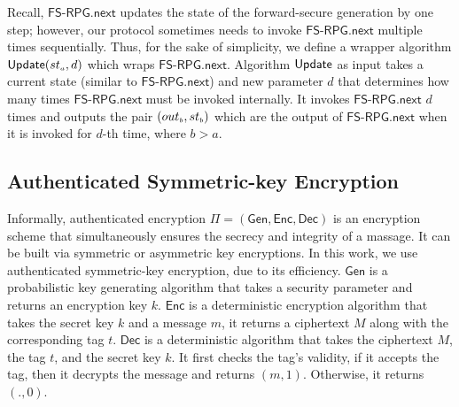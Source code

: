 Recall, $\mathsf{FS\text{-}RPG.next}$ updates the state of the forward-secure generation by one step; however, our protocol sometimes needs to invoke $\mathsf{FS\text{-}RPG.next}$ multiple times sequentially. Thus, for the sake of simplicity, we define a wrapper algorithm $ \mathsf{Update}({st}_{\scriptscriptstyle a}, d)$ which wraps  $\mathsf{FS\text{-}RPG.next}$. Algorithm $\mathsf{Update}$  as input takes a current state (similar to $\mathsf{FS\text{-}RPG.next}$) and new parameter $d$ that determines how many times   $\mathsf{FS\text{-}RPG.next}$ must be invoked internally. It invokes  $\mathsf{FS\text{-}RPG.next}$ $d$ times and outputs the pair  $({out}_{\scriptscriptstyle b}, {st}_{\scriptscriptstyle b})$  which are the output of $\mathsf{FS\text{-}RPG.next}$ when it is invoked for $d$-th time, where $ b> a$. 




 \vspace{-2mm}
 
\subsection{Authenticated Symmetric-key Encryption} 
Informally, authenticated encryption $\Pi=(\mathsf{Gen}, \mathsf{Enc}, \mathsf{Dec})$ is an encryption scheme that simultaneously ensures the secrecy and integrity of a massage. It can be built via symmetric or asymmetric key encryptions. In this work, we use authenticated symmetric-key encryption, due to its efficiency. $\mathsf{Gen}$ is a probabilistic key generating algorithm that takes a security parameter and returns an encryption key $k$. $\mathsf{Enc}$ is a deterministic encryption algorithm that takes the secret key $k$ and a message $m$, it returns a ciphertext $M$ along with the corresponding tag $t$. $\mathsf{Dec}$ is a deterministic algorithm that takes the ciphertext $M$, the tag $t$, and the secret key $k$. It first checks the tag's validity, if it accepts the tag, then it decrypts the message and returns $(m,1)$. Otherwise, it returns $(.,0)$. 


